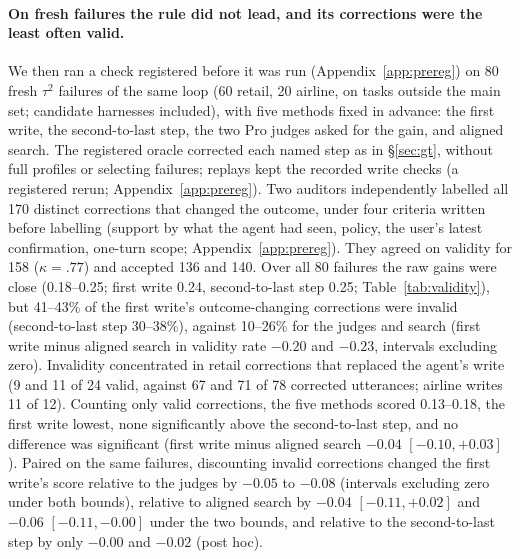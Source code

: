 \documentclass[11pt]{article}
\begin{document}
\paragraph{On fresh failures the rule did not lead, and its corrections were the least often valid.} We then ran a check registered before it was run (Appendix~\ref{app:prereg}) on 80 fresh $\tau^2$ failures of the same loop (60 retail, 20 airline, on tasks outside the main set; candidate harnesses included), with five methods fixed in advance: the first write, the second-to-last step, the two Pro judges asked for the gain, and aligned search. The registered oracle corrected each named step as in \S\ref{sec:gt}, without full profiles or selecting failures; replays kept the recorded write checks (a registered rerun; Appendix~\ref{app:prereg}). Two auditors independently labelled all 170 distinct corrections that changed the outcome, under four criteria written before labelling (support by what the agent had seen, policy, the user's latest confirmation, one-turn scope; Appendix~\ref{app:prereg}). They agreed on validity for 158 ($\kappa=.77$) and accepted 136 and 140. Over all 80 failures the raw gains were close (0.18--0.25; first write 0.24, second-to-last step 0.25; Table~\ref{tab:validity}), but 41--43\% of the first write's outcome-changing corrections were invalid (second-to-last step 30--38\%), against 10--26\% for the judges and search (first write minus aligned search in validity rate $-0.20$ and $-0.23$, intervals excluding zero). Invalidity concentrated in retail corrections that replaced the agent's write (9 and 11 of 24 valid, against 67 and 71 of 78 corrected utterances; airline writes 11 of 12). Counting only valid corrections, the five methods scored 0.13--0.18, the first write lowest, none significantly above the second-to-last step, and no difference was significant (first write minus aligned search $-0.04$ $[-0.10,+0.03]$). Paired on the same failures, discounting invalid corrections changed the first write's score relative to the judges by $-0.05$ to $-0.08$ (intervals excluding zero under both bounds), relative to aligned search by $-0.04$ $[-0.11,+0.02]$ and $-0.06$ $[-0.11,-0.00]$ under the two bounds, and relative to the second-to-last step by only $-0.00$ and $-0.02$ (post hoc).
\end{document}
